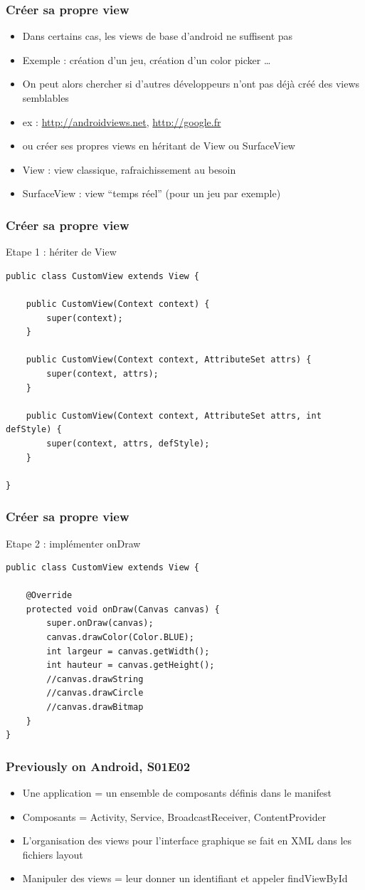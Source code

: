 \documentclass{beamer}
\begin{document}
\begin{frame}[fragile]
\frametitle{Créer sa propre view}
\begin{itemize}
  \item Dans certains cas, les views de base d'android ne suffisent pas
  \item Exemple : création d'un jeu, création d'un color picker \ldots
  \item On peut alors chercher si d'autres développeurs n'ont pas déjà créé des
  views semblables
  \item ex : \url{http://androidviews.net}, \url{http://google.fr}
  \item ou créer ses propres views en héritant de View ou SurfaceView
  \item View : view classique, rafraichissement au besoin
  \item SurfaceView : view ``temps réel'' (pour un jeu par exemple)
\end{itemize}
\end{frame}
\begin{frame}[fragile]
\frametitle{Créer sa propre view}
Etape 1 : hériter de View
\begin{lstlisting}
public class CustomView extends View {

    public CustomView(Context context) {
        super(context);
    }
    
    public CustomView(Context context, AttributeSet attrs) {
        super(context, attrs);
    }

    public CustomView(Context context, AttributeSet attrs, int defStyle) {
        super(context, attrs, defStyle);
    }
   
}
 \end{lstlisting}
\end{frame}
\begin{frame}[fragile]
\frametitle{Créer sa propre view}
Etape 2 : implémenter onDraw
\begin{lstlisting}
public class CustomView extends View {

    @Override
    protected void onDraw(Canvas canvas) {
        super.onDraw(canvas);
        canvas.drawColor(Color.BLUE);
        int largeur = canvas.getWidth();
        int hauteur = canvas.getHeight();
        //canvas.drawString
        //canvas.drawCircle
        //canvas.drawBitmap
    }
}
\end{lstlisting}
\end{frame}
\begin{frame}[fragile]
\frametitle{Previously on Android, S01E02}
\begin{itemize}
  \item Une application = un ensemble de composants définis dans le manifest
  \item Composants = Activity, Service, BroadcastReceiver, ContentProvider
  \item L'organisation des views pour l'interface graphique se fait en XML dans
  les fichiers layout
  \item Manipuler des views = leur donner un identifiant et appeler findViewById
\end{itemize}
\end{frame}
\end{document}
